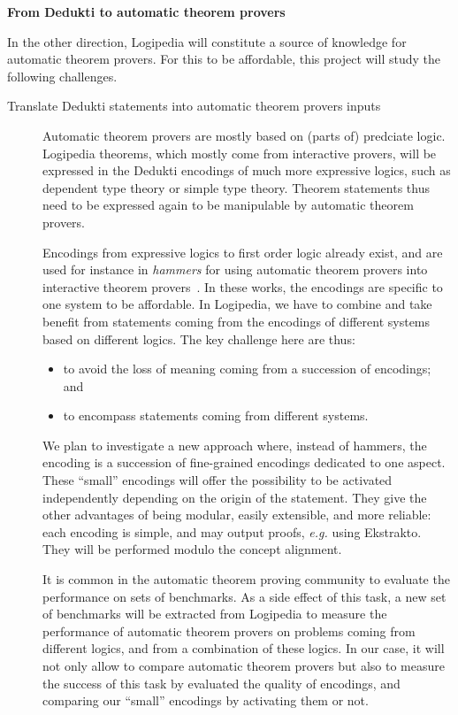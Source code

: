 \noindent
{\bf \large From Dedukti to automatic theorem provers}

In the other direction, Logipedia will constitute a source of
knowledge for automatic theorem provers. For this to be affordable,
this project will study the following challenges.

\begin{description}
\item[Translate Dedukti statements into automatic theorem provers
  inputs] Automatic theorem provers are mostly based on (parts of)
  predciate logic.  Logipedia theorems, which mostly come from
  interactive provers, will be expressed in the Dedukti encodings of
  much more expressive logics, such as dependent type theory or simple
  type theory.  Theorem statements thus need to be expressed again to be
  manipulable by automatic theorem provers.

  Encodings from expressive logics to first order logic already exist,
  and are used for instance in {\em hammers} for using automatic theorem provers into
  interactive theorem
  provers~\cite{DBLP:conf/lpar/PaulsonB10,DBLP:journals/jar/CzajkaK18}.
  In these works, the encodings are specific to one system to be
  affordable. In Logipedia, we have to combine and take benefit
  from statements coming from the encodings of different systems based
  on different logics. The key challenge here are thus:
  \begin{itemize}
  \item to avoid the loss of meaning coming from a succession of
    encodings; and
  \item to encompass statements coming from different systems.
  \end{itemize}
  We plan to investigate a new approach where, instead of hammers, the
  encoding is a succession of fine-grained encodings dedicated to one
  aspect. These ``small'' encodings will offer the possibility to be
  activated independently depending on the origin of the statement. They
  give the other advantages of being modular, easily extensible, and
  more reliable: each encoding is simple, and may output proofs, {\em
    e.g.} using Ekstrakto. They will be performed modulo the concept
  alignment.

  It is common in the automatic theorem proving community to evaluate the performance on
  sets of benchmarks. As a side effect of this task, a new set of
  benchmarks will be extracted from Logipedia to measure the
  performance of automatic theorem provers on problems coming from different logics, and from
  a combination of these logics. In our case, it will not only allow to
  compare automatic theorem provers but also to measure the success of this task by evaluated
  the quality of encodings, and comparing our ``small'' encodings by
  activating them or not.


\end{description}
